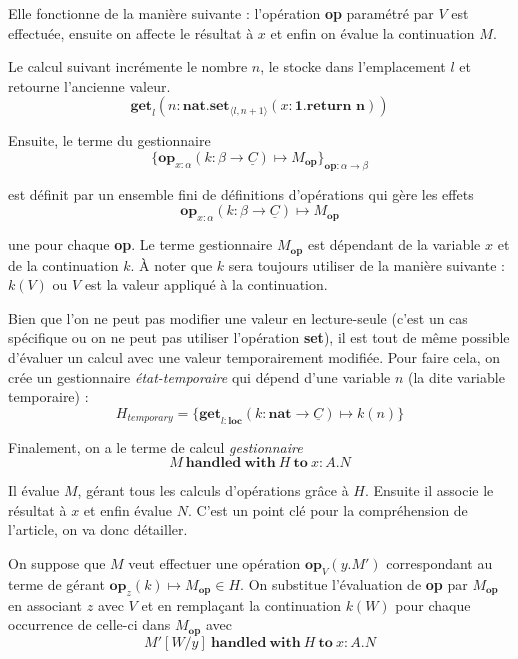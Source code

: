 	 Elle fonctionne de la manière suivante : l'opération \textbf{op} paramétré par $V$ est effectuée, ensuite on affecte le résultat à $x$ et enfin on évalue la continuation $M$.

	\begin{exemple}\label{get1}
		Le calcul suivant incrémente le nombre $n$, le stocke dans l'emplacement $l$ et retourne l'ancienne valeur.
		\[\textbf{get}_l(n:\textbf{nat}.\textbf{set}_{\langle l,n+1\rangle}(x:\textbf{1}.\textbf{return~n}))\]
	\end{exemple}
	\bigbreak
	
	Ensuite, le terme du gestionnaire
		\[\{\textbf{op}_{x:\alpha}(k:\beta \rightarrow \underline{C}) \mapsto M_\textbf{op} \}_{\textbf{op}:\alpha \rightarrow \beta}\]
		
	est définit par un ensemble fini de définitions d'opérations qui gère les effets 
		\[\textbf{op}_{x:\alpha}(k:\beta \rightarrow \underline{C}) \mapsto M_\textbf{op}\]
			
	une pour chaque \textbf{op}. Le terme gestionnaire $M_\textbf{op}$ est dépendant de la variable $x$ et de la continuation $k$. À noter que $k$ sera toujours utiliser de la manière suivante : $k(V)$ ou $V$ est la valeur appliqué à la continuation.
	
	\begin{exemple}\label{get2}
		Bien que l'on ne peut pas modifier une valeur en lecture-seule (c'est un cas spécifique ou on ne peut pas utiliser l'opération \textbf{set}), il est tout de même possible d'évaluer un calcul avec une valeur temporairement modifiée. Pour faire cela, on crée un gestionnaire \textit{état-temporaire} qui dépend d'une variable $n$ (la dite variable temporaire) :
		\[H_{temporary} = \{\textbf{get}_{l:\textbf{loc}}(k:\textbf{nat} \rightarrow \underline{C}) \mapsto k(n)\}\]

	\end{exemple}

	Finalement, on a le terme de calcul \textit{gestionnaire}
		\[M~\textbf{handled}~\textbf{with}~H~\textbf{to}~x:A.N\]		

	Il évalue $M$, gérant tous les calculs d'opérations grâce à $H$. Ensuite il associe le résultat à $x$ et enfin évalue $N$. C'est un point clé pour la compréhension de l'article, on va donc détailler. 
	
	On suppose que $M$ veut effectuer une opération $\textbf{op}_V(y.M')$ correspondant au terme de gérant $\textbf{op}_z(k) \mapsto M_\textbf{op} \in H$. On substitue l'évaluation de \textbf{op} par $M_\textbf{op}$ en associant $z$ avec $V$ et en remplaçant la continuation $k(W)$ pour chaque occurrence de celle-ci dans $M_\textbf{op}$ avec 
		\[M'[W/y]~\textbf{handled}~\textbf{with}~H~\textbf{to}~x:A.N\]

